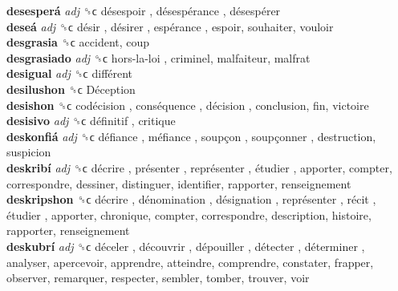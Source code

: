 \textbf{desesperá} \emph{adj}  ␝ϲ   désespoir ,  désespérance ,  désespérer   \\
\textbf{deseá} \emph{adj}  ␝ϲ   désir ,  désirer ,  espérance , espoir, souhaiter, vouloir  \\
\textbf{desgrasia} ␝ϲ  accident, coup  \\
\textbf{desgrasiado} \emph{adj}  ␝ϲ   hors-la-loi , criminel, malfaiteur, malfrat  \\
\textbf{desigual} \emph{adj}  ␝ϲ   différent   \\
\textbf{desilushon} ␝ϲ   Déception   \\
\textbf{desishon} ␝ϲ   codécision ,  conséquence ,  décision , conclusion, fin, victoire  \\
\textbf{desisivo} \emph{adj}  ␝ϲ   définitif , critique  \\
\textbf{deskonfiá} \emph{adj}  ␝ϲ   défiance ,  méfiance ,  soupçon ,  soupçonner , destruction, suspicion  \\
\textbf{deskribí} \emph{adj}  ␝ϲ   décrire ,  présenter ,  représenter ,  étudier , apporter, compter, correspondre, dessiner, distinguer, identifier, rapporter, renseignement  \\
\textbf{deskripshon} ␝ϲ   décrire ,  dénomination ,  désignation ,  représenter ,  récit ,  étudier , apporter, chronique, compter, correspondre, description, histoire, rapporter, renseignement  \\
\textbf{deskubrí} \emph{adj}  ␝ϲ   déceler ,  découvrir ,  dépouiller ,  détecter ,  déterminer , analyser, apercevoir, apprendre, atteindre, comprendre, constater, frapper, observer, remarquer, respecter, sembler, tomber, trouver, voir  \\
